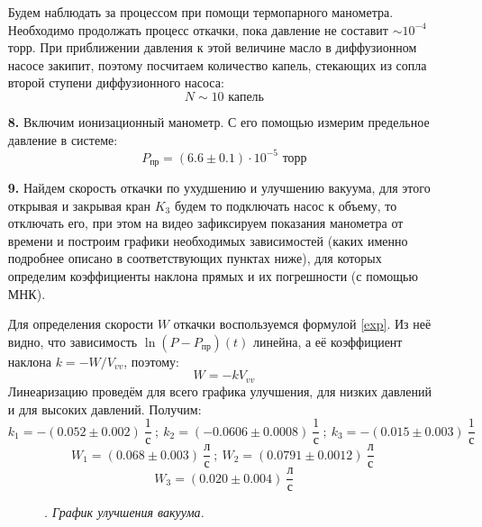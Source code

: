 \documentclass[a4paper]{article}
\begin{document}
\begin{itemize}
\noindent
Будем наблюдать за процессом при помощи термопарного манометра. Необходимо продолжать процесс откачки, пока давление не составит $\sim 10^{-4}$ торр. При приближении давления к этой величине масло в диффузионном насосе закипит, поэтому посчитаем количество капель, стекающих из сопла второй ступени диффузионного насоса:
\[N \sim 10 \text{ капель} \]
\item[\textbf{8. }] Включим ионизационный манометр. С его помощью измерим предельное давление в системе:
\[P_{\text{пр}} = (6.6 \pm 0.1) \cdot 10^{-5} \text{ торр} \]
\item[\textbf{9. }] Найдем скорость откачки по ухудшению и улучшению вакуума, для этого открывая и закрывая кран $K_3$ будем то подключать насос к объему, то отключать его, при этом на видео зафиксируем показания манометра от времени и построим графики необходимых  зависимостей (каких именно подробнее описано в соответствующих пунктах ниже), для которых определим коэффициенты наклона прямых и их погрешности (с помощью МНК).

\noindent
Для определения скорости $W$ откачки воспользуемся формулой \eqref{exp}. Из неё видно, что зависимость $\ln(P-P_{пр})(t)$ линейна, а её коэффициент наклона $k = -W/V_{vv}$, поэтому:
\[W = -k V_{vv}\]
Линеаризацию проведём для всего графика улучшения, для низких давлений и для высоких давлений. Получим:
\[k_1 = -(0.052 \pm 0.002) \ \frac{1}{\text{с}} \  ; \ k_2 = (-0.0606 \pm 0.0008) \ \frac{1}{\text{с}} \ ; \ k_3 = -(0.015 \pm 0.003) \  \frac{1}{\text{с}}\]
\[W_1 = (0.068 \pm 0.003) \ \frac{\text{л}}{\text{с}} \ ; \ W_2 = (0.0791 \pm 0.0012) \ \frac{\text{л}}{\text{с}} \ \]
\[W_3 = (0.020 \pm 0.004) \ \frac{\text{л}}{\text{с}} \]

\begin{figure}
\caption{\textit{. График улучшения вакуума.}}
\end{figure}


\end{itemize}
\end{document}
